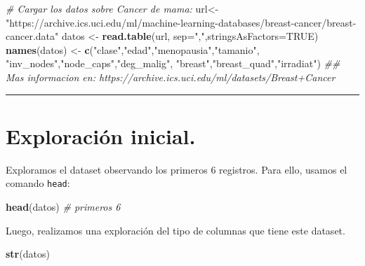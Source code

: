 \documentclass[
]{article}
\newenvironment{Shaded}{\begin{snugshade}}{\end{snugshade}}
\newcommand{\CommentTok}[1]{\textcolor[rgb]{0.56,0.35,0.01}{\textit{#1}}}
\newcommand{\DataTypeTok}[1]{\textcolor[rgb]{0.13,0.29,0.53}{#1}}
\newcommand{\KeywordTok}[1]{\textcolor[rgb]{0.13,0.29,0.53}{\textbf{#1}}}
\newcommand{\NormalTok}[1]{#1}
\newcommand{\OtherTok}[1]{\textcolor[rgb]{0.56,0.35,0.01}{#1}}
\newcommand{\StringTok}[1]{\textcolor[rgb]{0.31,0.60,0.02}{#1}}
\begin{document}
\begin{Shaded}
\begin{Highlighting}[]
\CommentTok{# Cargar los datos sobre Cancer de mama:}
\NormalTok{url<-}\StringTok{"https://archive.ics.uci.edu/ml/machine-learning-databases/breast-cancer/breast-cancer.data"}
\NormalTok{datos <-}\StringTok{ }\KeywordTok{read.table}\NormalTok{(url, }\DataTypeTok{sep=}\StringTok{","}\NormalTok{,}\DataTypeTok{stringsAsFactors=}\OtherTok{TRUE}\NormalTok{)}
\KeywordTok{names}\NormalTok{(datos) <-}\StringTok{ }\KeywordTok{c}\NormalTok{(}\StringTok{"clase"}\NormalTok{,}\StringTok{"edad"}\NormalTok{,}\StringTok{"menopausia"}\NormalTok{,}\StringTok{"tamanio"}\NormalTok{,}
                       \StringTok{"inv_nodes"}\NormalTok{,}\StringTok{"node_caps"}\NormalTok{,}\StringTok{"deg_malig"}\NormalTok{,}
                       \StringTok{"breast"}\NormalTok{,}\StringTok{"breast_quad"}\NormalTok{,}\StringTok{"irradiat"}\NormalTok{)}
\CommentTok{## Mas informacion en: https://archive.ics.uci.edu/ml/datasets/Breast+Cancer}
\end{Highlighting}
\end{Shaded}

\begin{center}\rule{0.5\linewidth}{0.5pt}\end{center}

\hypertarget{exploraciuxf3n-inicial.}{%
\section{Exploración inicial.}\label{exploraciuxf3n-inicial.}}

Exploramos el dataset observando los primeros 6 registros. Para ello,
usamos el comando \texttt{head}:

\begin{Shaded}
\begin{Highlighting}[]
\KeywordTok{head}\NormalTok{(datos) }\CommentTok{# primeros 6 }
\end{Highlighting}
\end{Shaded}

Luego, realizamos una exploración del tipo de columnas que tiene este
dataset.

\begin{Shaded}
\begin{Highlighting}[]
\KeywordTok{str}\NormalTok{(datos)}
\end{Highlighting}
\end{Shaded}
\end{document}
